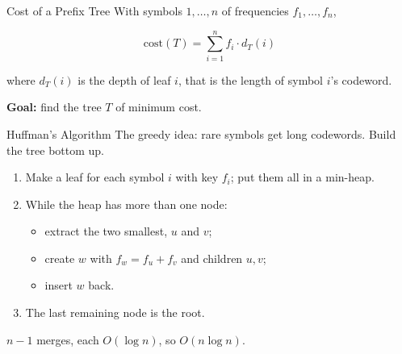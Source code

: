 \documentclass[10pt,aspectratio=169]{beamer}
\begin{document}
\begin{frame}{Cost of a Prefix Tree}
  With symbols $1, \ldots, n$ of frequencies $f_1, \ldots, f_n$,

  \begin{alertblock}{}
    \[
      \text{cost}(T) = \sum_{i=1}^{n} f_i \cdot d_T(i)
    \]
  \end{alertblock}

  \bigskip
  where $d_T(i)$ is the depth of leaf $i$, that is the length of symbol $i$'s
  codeword.

  \bigskip
  \begin{center}
    \textbf{Goal:} find the tree $T$ of minimum cost.
  \end{center}
\end{frame}

\begin{frame}{Huffman's Algorithm}
  The greedy idea: \alert{rare symbols get long codewords}. Build the tree
  \alert{bottom up}.

  \bigskip
  \begin{enumerate}
    \item Make a leaf for each symbol $i$ with key $f_i$; put them all in a
          min-heap.
    \bigskip
    \item While the heap has more than one node:
      \begin{itemize}
        \item[] extract the two smallest, $u$ and $v$;
        \item[] create $w$ with $f_w = f_u + f_v$ and children $u, v$;
        \item[] insert $w$ back.
      \end{itemize}
    \bigskip
    \item The last remaining node is the root.
  \end{enumerate}

  \bigskip
  \begin{center}
    $n-1$ merges, each $O(\log n)$, so $O(n \log n)$.
  \end{center}
\end{frame}
\end{document}
